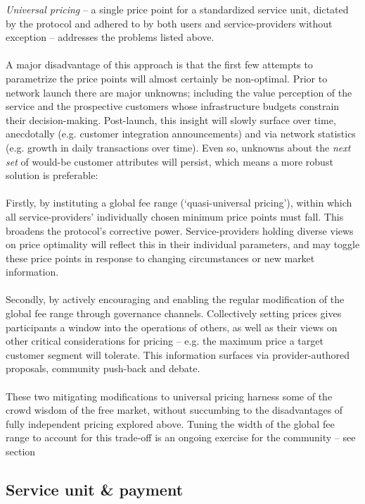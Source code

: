 \documentclass[longbibliography,nofootinbib]{revtex4-1}
\begin{document}
\textit{Universal pricing} – a single price point for a standardized service unit, dictated by the protocol and adhered to by both users and service-providers without exception – addresses the problems listed above. 
\\\\
A major disadvantage of this approach is that the first few attempts to parametrize the price points will almost certainly be non-optimal. Prior to network launch there are major unknowns; including the value perception of the service and the prospective customers whose infrastructure budgets constrain their decision-making. Post-launch, this insight will slowly surface over time, anecdotally (e.g. customer integration announcements) and via network statistics (e.g. growth in daily transactions over time). Even so, unknowns about the \textit{next set} of would-be customer attributes will persist, which means a more robust solution is preferable: 
\\\\
Firstly, by instituting a global fee range (‘quasi-universal pricing’), within which all service-providers’ individually chosen minimum price points must fall. This broadens the protocol's corrective power. Service-providers holding diverse views on price optimality will reflect this in their individual parameters, and may toggle these price points in response to changing circumstances or new market information.
\\\\
Secondly, by actively encouraging and enabling the regular modification of the global fee range through governance channels. Collectively setting prices gives participants a window into the operations of others, as well as their views on other critical considerations for pricing – e.g. the maximum price a target customer segment will tolerate. This information surfaces via provider-authored proposals, community push-back and debate. 
\\\\
These two mitigating modifications to universal pricing harness some of the crowd wisdom of the free market, without succumbing to the disadvantages of fully independent pricing explored above. Tuning the width of the global fee range to account for this trade-off is an ongoing exercise for the community – see section 

\subsection{Service unit \& payment}
\end{document}
